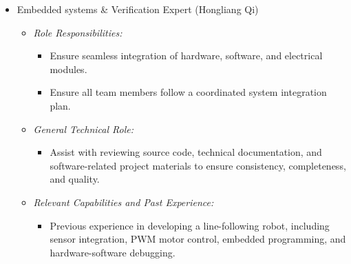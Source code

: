 \documentclass{article}
\begin{document}
\begin{itemize}
\begin{itemize}
    	\item \textit{General Technical Role:}
    	\begin{itemize}
    		\item Assist with design and implementation of software architecture for robot autonomy 
    		\item Design of simulation environment to prototype and validate approach. 
    	\end{itemize}
    	
    	\item \textit{Relevant Capabilities and Past Experience:}
    	\begin{itemize}
    		\item 16 months of cumulative research experience in robotics, focusing on, safe local navigation, evolutionary computing and optimal sensor placement. 
    		\item 4 months of industry experience at stealth startup working on deployment of computer vision system for anomaly detection in agricultural crops. 
    	\end{itemize}
    \end{itemize}
    
    \item Embedded systems \& Verification Expert  (Hongliang Qi) \label{role:embedded_expert}
    \begin{itemize}
    	\item \textit{Role Responsibilities:}
    	\begin{itemize}
    		\item Ensure seamless integration of hardware, software, and electrical modules.
    		\item Ensure all team members follow a coordinated system integration plan. 
    	\end{itemize}
    	
    	\item \textit{General Technical Role:}
    	\begin{itemize}
    		\item Assist with reviewing source code, technical documentation, and software-related project materials to ensure consistency, completeness, and quality.
    	\end{itemize}
    	
    	\item \textit{Relevant Capabilities and Past Experience:}
    	\begin{itemize}
    		\item Previous experience in developing a line-following robot, including sensor integration, PWM motor control, embedded programming, and hardware-software debugging. 
    	\end{itemize}	
    	

\end{itemize}
\end{itemize}
\end{document}
